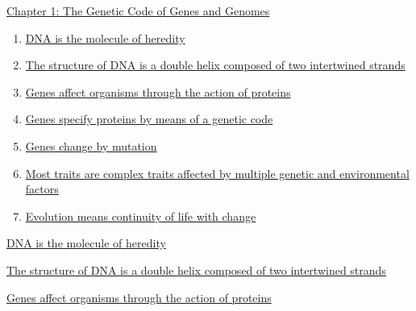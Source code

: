 \documentclass[12pt,letterpaper]{article}
\begin{document}
\begin{chapbox}{\hyperlink{home}{Chapter 1: The Genetic Code of Genes
    and Genomes}}
    \begin{enumerate}
        \item \hyperlink{1.1}{DNA is the molecule of heredity}
        \item \hyperlink{1.2}{The structure of DNA is a double helix composed of two intertwined strands}
        \item \hyperlink{1.3}{Genes affect organisms through the action of proteins}
        \item \hyperlink{1.4}{Genes specify proteins by means of a genetic code}
        \item \hyperlink{1.5}{Genes change by mutation}
        \item \hyperlink{1.6}{Most traits are complex traits affected by multiple genetic and environmental factors}
        \item \hyperlink{1.7}{Evolution means continuity of life with change}
    \end{enumerate}
\end{chapbox}
\hypertarget{1.1}{}
\begin{secbox}{\hyperlink{1}{DNA is the molecule of heredity}}{

}\end{secbox}
\hypertarget{1.2}{}
\begin{secbox}{\hyperlink{1}{The structure of DNA is a double helix composed of two intertwined strands}}{

}\end{secbox}
\hypertarget{1.3}{}
\begin{secbox}{\hyperlink{1}{Genes affect organisms through the action of proteins}}{

}\end{secbox}
\end{document}

